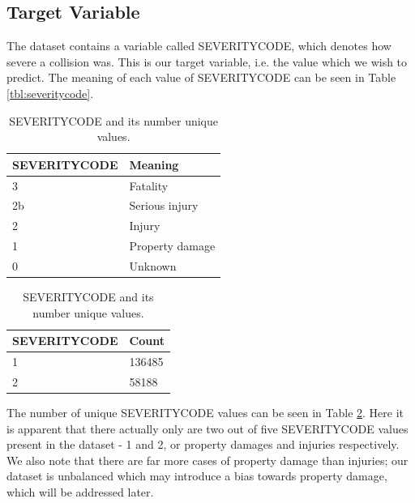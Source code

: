 \documentclass[12pt,a4paper,oneside]{article}
\begin{document}
\subsection{Target Variable}

The dataset contains a variable called SEVERITYCODE, which denotes how severe a collision was. 
This is our target variable, i.e. the value which we wish to predict. 
The meaning of each value of SEVERITYCODE can be seen in Table \ref{tbl:severitycode}.

\begin{table}[htbp!]
    \centering
    \caption{Overview of the target variable SEVERITYCODE.}
    \label{tbl:target_variable}
    \begin{subtable}[h]{\textwidth}
        \centering
        \caption{SEVERITYCODE and its corresponding meaning for traffic collision outcomes.}
        \label{tbl:severitycode}
        \begin{tabular}{l l}
            \toprule
            SEVERITYCODE & Meaning \\
            \midrule
            3 & Fatality \\
            2b & Serious injury \\
            2 & Injury \\
            1 & Property damage \\
            0 & Unknown \\
            \bottomrule
        \end{tabular}
    \end{subtable}

    \begin{subtable}[h]{\textwidth}
        \centering
        \caption{SEVERITYCODE and its number unique values.}
        \label{tbl:severitycode_count}
        \begin{tabular}{l l}
            \toprule
            SEVERITYCODE & Count \\
            \midrule
            1 & 136485 \\
            2 & 58188 \\
            \bottomrule
        \end{tabular}
    \end{subtable}

\end{table}

The number of unique SEVERITYCODE values can be seen in Table \ref{tbl:severitycode_count}. 
Here it is apparent that there actually only are two out of five SEVERITYCODE values present in the dataset - 1 and 2, or property damages and injuries respectively. 
We also note that there are far more cases of property damage than injuries; our dataset is unbalanced which may introduce a bias towards property damage, which will be addressed later. 
\end{document}
